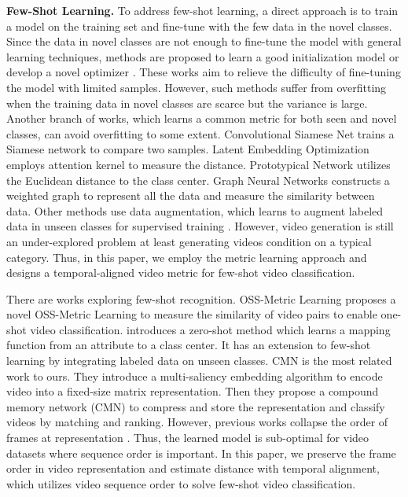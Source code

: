 \documentclass[10pt,twocolumn,letterpaper]{article}
\begin{document}
\noindent \textbf{Few-Shot Learning.}
To address few-shot learning, a direct approach is to train a model on the training set and fine-tune with the few data in the novel classes. Since the data in novel classes are not enough to fine-tune the model with general learning techniques, methods are proposed to learn a good initialization model \cite{finn2017model,nichol2018reptile,rusu2018meta} or develop a novel optimizer \cite{ravi2016optimization,munkhdalai2017meta}. These works aim to relieve the difficulty of fine-tuning the model with limited samples. However, such methods suffer from overfitting when the training data in novel classes are scarce but the variance is large. Another branch of works, which learns a common metric for both seen and novel classes, can avoid overfitting to some extent. Convolutional Siamese Net \cite{koch2015siamese} trains a Siamese network to compare two samples. Latent Embedding Optimization \cite{vinyals2016matching} employs attention
kernel to measure the distance. Prototypical Network \cite{snell2017prototypical} utilizes the Euclidean distance to the class center. Graph Neural Networks \cite{garcia2017few} constructs a weighted graph to represent all the data and measure the similarity between data. Other methods use data augmentation, which learns to augment labeled data in unseen classes for supervised training \cite{hariharan2017low,wang2018low}. However, video generation is still an under-explored problem at least generating videos condition on a typical category. Thus, in this paper, we employ the metric learning approach and designs a temporal-aligned video metric for few-shot video classification.

There are works exploring few-shot recognition. OSS-Metric Learning \cite{kliper2011one} proposes a novel OSS-Metric Learning to measure the similarity of video pairs to enable one-shot video classification. \cite{mishra2018generative} introduces a zero-shot method which learns a mapping function from an attribute to a class center. It has an extension to few-shot learning by integrating labeled data on unseen classes. CMN \cite{zhu2018compound} is the most related work to ours. They introduce a multi-saliency embedding algorithm to encode video into a fixed-size matrix representation. Then they propose a compound memory network (CMN) to compress and store the representation and classify videos by matching and ranking. However, previous works collapse the order of frames at representation \cite{kliper2011one,mishra2018generative,zhu2018compound}. Thus, the learned model is sub-optimal for video datasets where sequence order is important. In this paper, we preserve the frame order in video representation and estimate distance with temporal alignment, which utilizes video sequence order to solve few-shot video classification.
\end{document}
